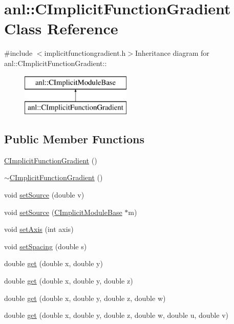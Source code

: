 \hypertarget{classanl_1_1CImplicitFunctionGradient}{
\section{anl::CImplicitFunctionGradient Class Reference}
\label{classanl_1_1CImplicitFunctionGradient}
}


{\ttfamily \#include $<$implicitfunctiongradient.h$>$}Inheritance diagram for anl::CImplicitFunctionGradient::\begin{figure}[H]
\begin{center}
\leavevmode
\includegraphics[height=2cm]{classanl_1_1CImplicitFunctionGradient}
\end{center}
\end{figure}
\subsection*{Public Member Functions}
\begin{DoxyCompactItemize}
\item 
\hyperlink{classanl_1_1CImplicitFunctionGradient_a5a4a8b102526ac04409f0d0f3ccb3663}{CImplicitFunctionGradient} ()
\item 
\hyperlink{classanl_1_1CImplicitFunctionGradient_a9b620a6f91cadb8aa6df7928d12eb21a}{$\sim$CImplicitFunctionGradient} ()
\item 
void \hyperlink{classanl_1_1CImplicitFunctionGradient_a7a9bd61935b3ed907438b3ce36417b82}{setSource} (double v)
\item 
void \hyperlink{classanl_1_1CImplicitFunctionGradient_a6a62ce2609113a5f782536fa6dc82f04}{setSource} (\hyperlink{classanl_1_1CImplicitModuleBase}{CImplicitModuleBase} $\ast$m)
\item 
void \hyperlink{classanl_1_1CImplicitFunctionGradient_a7e98e47172df7bf0147011f33a9b14b9}{setAxis} (int axis)
\item 
void \hyperlink{classanl_1_1CImplicitFunctionGradient_a055fd8a37ba7e686b67b65671f78edd8}{setSpacing} (double s)
\item 
double \hyperlink{classanl_1_1CImplicitFunctionGradient_ab9f146161cbb8ab46ee5260467139c8b}{get} (double x, double y)
\item 
double \hyperlink{classanl_1_1CImplicitFunctionGradient_a4844ed9eeaa55d149d5f918915a54f12}{get} (double x, double y, double z)
\item 
double \hyperlink{classanl_1_1CImplicitFunctionGradient_a31fceb058f6c34b8f63d463de1f3f9a6}{get} (double x, double y, double z, double w)
\item 
double \hyperlink{classanl_1_1CImplicitFunctionGradient_ad37b8c002f1b4b44f0dd8af144fa59a8}{get} (double x, double y, double z, double w, double u, double v)
\end{DoxyCompactItemize}
